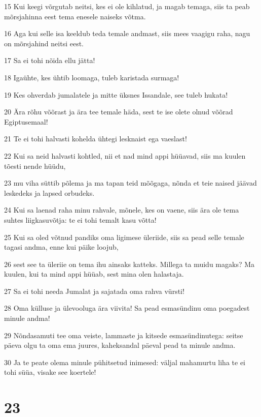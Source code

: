 \par 15 Kui keegi võrgutab neitsi, kes ei ole kihlatud, ja magab temaga, siis ta peab mõrsjahinna eest tema enesele naiseks võtma.
\par 16 Aga kui selle isa keeldub teda temale andmast, siis mees vaagigu raha, nagu on mõrsjahind neitsi eest.
\par 17 Sa ei tohi nõida ellu jätta!
\par 18 Igaühte, kes ühtib loomaga, tuleb karistada surmaga!
\par 19 Kes ohverdab jumalatele ja mitte üksnes Issandale, see tuleb hukata!
\par 20 Ära rõhu võõrast ja ära tee temale häda, sest te ise olete olnud võõrad Egiptusemaal!
\par 21 Te ei tohi halvasti kohelda ühtegi lesknaist ega vaeslast!
\par 22 Kui sa neid halvasti kohtled, nii et nad mind appi hüüavad, siis ma kuulen tõesti nende hüüdu,
\par 23 mu viha süttib põlema ja ma tapan teid mõõgaga, nõnda et teie naised jäävad leskedeks ja lapsed orbudeks.
\par 24 Kui sa laenad raha minu rahvale, mõnele, kes on vaene, siis ära ole tema suhtes liigkasuvõtja: te ei tohi temalt kasu võtta!
\par 25 Kui sa oled võtnud pandiks oma ligimese üleriide, siis sa pead selle temale tagasi andma, enne kui päike loojub,
\par 26 sest see ta üleriie on tema ihu ainsaks katteks. Millega ta muidu magaks? Ma kuulen, kui ta mind appi hüüab, sest mina olen halastaja.
\par 27 Sa ei tohi needa Jumalat ja sajatada oma rahva vürsti!
\par 28 Oma külluse ja ülevooluga ära viivita! Sa pead esmasündinu oma poegadest minule andma!
\par 29 Nõndasamuti tee oma veiste, lammaste ja kitsede esmasündinutega: seitse päeva olgu ta oma ema juures, kaheksandal päeval pead ta minule andma.
\par 30 Ja te peate olema minule pühitsetud inimesed: väljal mahamurtu liha te ei tohi süüa, visake see koertele!

\chapter{23}


